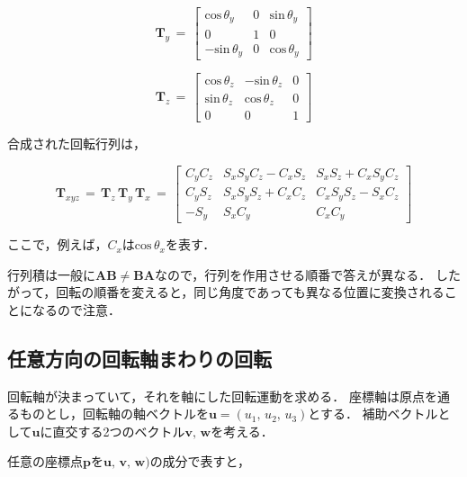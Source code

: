 \begin{equation}
{\bm T}_y \,=\,
\left[
\begin{array}{ccc}
\mathrm{cos}\,\theta_y & 0 & \mathrm{sin}\,\theta_y\\
0 & 1 & 0\\
\mathrm{-sin}\,\theta_y & 0 & \mathrm{cos}\,\theta_y
\end{array}
\right]
\label{eq:Ty}
\end{equation}

\begin{equation}
{\bm T}_z \,=\,
\left[
\begin{array}{ccc}
\mathrm{cos}\,\theta_z & \mathrm{-sin}\,\theta_z & 0\\
\mathrm{sin}\,\theta_z & \mathrm{cos}\,\theta_z & 0\\
0 & 0 & 1
\end{array}
\right]
\label{eq:Tz}
\end{equation}

\vspace{3mm}

合成された回転行列は，

\begin{equation}
{\bm T}_{xyz} \,=\, {\bm T}_z\, {\bm T}_y\, {\bm T}_x \,=\,
\left[
\begin{array}{ccc}
C_y C_z & S_x S_y C_z - C_x S_z & S_x S_z + C_x S_y C_z\\
C_y S_z & S_x S_y S_z + C_x C_z & C_x S_y S_z - S_x C_z\\
-S_y & S_x C_y & C_x C_y
\end{array}
\right]
\label{eq:Txyz}
\end{equation}

\noindent ここで，例えば，$C_x$は$\mathrm{cos}\,\theta_x$を表す．

行列積は一般に$\bm{AB} \neq \bm{BA}$なので，行列を作用させる順番で答えが異なる．
したがって，回転の順番を変えると，同じ角度であっても異なる位置に変換されることになるので注意．

%
\subsection{任意方向の回転軸まわりの回転}
回転軸が決まっていて，それを軸にした回転運動を求める．
座標軸は原点を通るものとし，回転軸の軸ベクトルを$\bm u =(u_1,\, u_2,\, u_3)$とする．
補助ベクトルとして$\bm u$に直交する2つのベクトル$\bm v,\, \bm w$を考える．

任意の座標点$\bm p$を$\bm u,\, \bm v,\, \bm w)$の成分で表すと，

